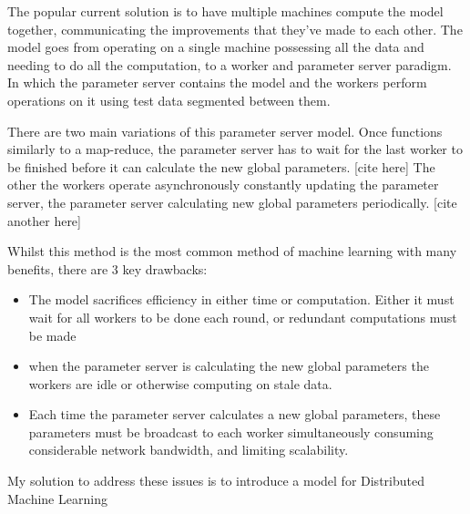 The popular current solution is to have multiple machines compute the model
together, communicating the improvements that they've made to each other. The
model goes from operating on a single machine possessing all the data and
needing to do all the computation, to a worker and parameter server paradigm. In
which the parameter server contains the model and the workers perform operations
on it using test data segmented between them. \cite{ParameterServers}
\par

There are two main variations of this parameter server model.
\newline
Once functions similarly to a map-reduce, the parameter server has to
wait for the last worker to be finished before it can calculate the new
global parameters. [cite here]
\newline
The other the workers operate asynchronously constantly updating the parameter server,
the parameter server calculating new global parameters periodically.  [cite another here]
\par

Whilst this method is the most common method of machine learning with many benefits, there are 3 key drawbacks:
\begin{itemize}
    \item The model sacrifices efficiency in either time or computation. Either
    it must wait for all workers to be done each round, or redundant
    computations must be made
    \item when the parameter server is calculating the new global parameters the
    workers are idle or otherwise computing on stale data.
    \item Each time the parameter server calculates a new global parameters,
    these parameters must be broadcast to each worker simultaneously consuming
    considerable network bandwidth, and limiting scalability.
\end{itemize}

My solution to address these issues is to introduce a model for Distributed Machine Learning 
    

  






